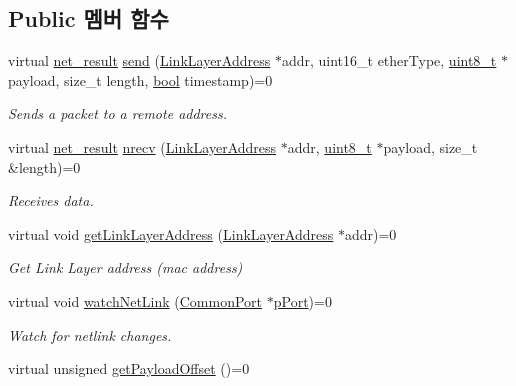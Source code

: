 \subsection*{Public 멤버 함수}
\begin{DoxyCompactItemize}
\item 
virtual \hyperlink{avbts__osnet_8hpp_a21b2b4b5e479ef3adfc039ac30c961cd}{net\+\_\+result} \hyperlink{class_o_s_network_interface_a6008109206a5bd3bb0d9b850fb0da452}{send} (\hyperlink{class_link_layer_address}{Link\+Layer\+Address} $\ast$addr, uint16\+\_\+t ether\+Type, \hyperlink{stdint_8h_aba7bc1797add20fe3efdf37ced1182c5}{uint8\+\_\+t} $\ast$payload, size\+\_\+t length, \hyperlink{avb__gptp_8h_af6a258d8f3ee5206d682d799316314b1}{bool} timestamp)=0
\begin{DoxyCompactList}\small\item\em Sends a packet to a remote address. \end{DoxyCompactList}\item 
virtual \hyperlink{avbts__osnet_8hpp_a21b2b4b5e479ef3adfc039ac30c961cd}{net\+\_\+result} \hyperlink{class_o_s_network_interface_a180931fa9d850cc342bc0ecd7b04e12a}{nrecv} (\hyperlink{class_link_layer_address}{Link\+Layer\+Address} $\ast$addr, \hyperlink{stdint_8h_aba7bc1797add20fe3efdf37ced1182c5}{uint8\+\_\+t} $\ast$payload, size\+\_\+t \&length)=0
\begin{DoxyCompactList}\small\item\em Receives data. \end{DoxyCompactList}\item 
virtual void \hyperlink{class_o_s_network_interface_afa6f02e622bb5f5f1cbf9b0b21b50fe1}{get\+Link\+Layer\+Address} (\hyperlink{class_link_layer_address}{Link\+Layer\+Address} $\ast$addr)=0
\begin{DoxyCompactList}\small\item\em Get Link Layer address (mac address) \end{DoxyCompactList}\item 
virtual void \hyperlink{class_o_s_network_interface_afc43662e3774645bd8443dc68e5e6ea2}{watch\+Net\+Link} (\hyperlink{class_common_port}{Common\+Port} $\ast$\hyperlink{linux_2src_2daemon__cl_8cpp_aca059781ed4d0e5fca3b46246d5c5ad3}{p\+Port})=0
\begin{DoxyCompactList}\small\item\em Watch for netlink changes. \end{DoxyCompactList}\item 
virtual unsigned \hyperlink{class_o_s_network_interface_a7a0710f80e693b0d4008d8501aaffcdc}{get\+Payload\+Offset} ()=0

\end{DoxyCompactItemize}
